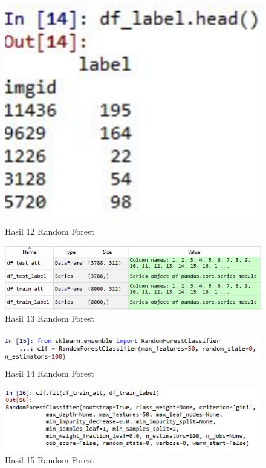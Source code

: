 \begin{figure}[ht]
	\centerline{\includegraphics[width=1\textwidth]{figures/huda/chapter3_praktek/16.JPG}}
	\caption{Hasil 12 Random Forest}
	\label{h20}
\end{figure}

\begin{figure}[ht]
	\centerline{\includegraphics[width=1\textwidth]{figures/huda/chapter3_praktek/17.JPG}}
	\caption{Hasil 13 Random Forest}
	\label{h21}
\end{figure}

\begin{figure}[ht]
	\centerline{\includegraphics[width=1\textwidth]{figures/huda/chapter3_praktek/18.JPG}}
	\caption{Hasil 14 Random Forest}
	\label{h22}
\end{figure}

\begin{figure}[ht]
	\centerline{\includegraphics[width=1\textwidth]{figures/huda/chapter3_praktek/19.JPG}}
	\caption{Hasil 15 Random Forest}
	\label{h23}
\end{figure}

